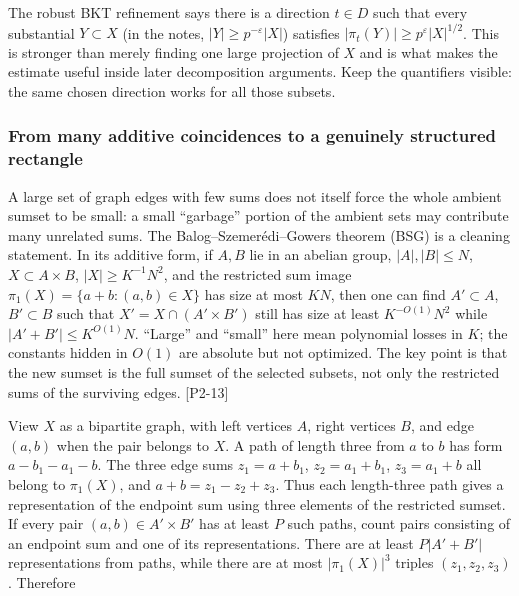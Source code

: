 The robust BKT refinement says there is a direction \(t\in D\) such that every substantial \(Y\subset X\) (in the notes, \(|Y|\ge p^{-\varepsilon}|X|\)) satisfies \(|\pi_t(Y)|\ge p^{\varepsilon}|X|^{1/2}\). This is stronger than merely finding one large projection of \(X\) and is what makes the estimate useful inside later decomposition arguments. Keep the quantifiers visible: the same chosen direction works for all those subsets.

\subsubsection{From many additive coincidences to a genuinely structured rectangle}\label{04-visual-computing-ii-ch033-from-many-additive-coincidences-to-a-genuinely-structured-rectangle}

\hypertarget{04-visual-computing-ii-ch033-from-many-additive-coincidences-to-a-genuinely-structured-rectangle}{}

A large set of graph edges with few sums does not itself force the whole ambient sumset to be small: a small ``garbage'' portion of the ambient sets may contribute many unrelated sums. The Balog--Szemerédi--Gowers theorem (BSG) is a cleaning statement. In its additive form, if \(A,B\) lie in an abelian group, \(|A|,|B|\le N\), \(X\subset A\times B\), \(|X|\ge K^{-1}N^2\), and the restricted sum image \(\pi_1(X)=\{a+b:(a,b)\in X\}\) has size at most \(KN\), then one can find \(A'\subset A\), \(B'\subset B\) such that \(X'=X\cap(A'\times B')\) still has size at least \(K^{-O(1)}N^2\) while \(|A'+B'|\le K^{O(1)}N\). ``Large'' and ``small'' here mean polynomial losses in \(K\); the constants hidden in \(O(1)\) are absolute but not optimized. The key point is that the new sumset is the full sumset of the selected subsets, not only the restricted sums of the surviving edges. {[}P2-13{]}

View \(X\) as a bipartite graph, with left vertices \(A\), right vertices \(B\), and edge \((a,b)\) when the pair belongs to \(X\). A path of length three from \(a\) to \(b\) has form \(a-b_1-a_1-b\). The three edge sums \(z_1=a+b_1\), \(z_2=a_1+b_1\), \(z_3=a_1+b\) all belong to \(\pi_1(X)\), and \(a+b=z_1-z_2+z_3\). Thus each length-three path gives a representation of the endpoint sum using three elements of the restricted sumset. If every pair \((a,b)\in A'\times B'\) has at least \(P\) such paths, count pairs consisting of an endpoint sum and one of its representations. There are at least \(P|A'+B'|\) representations from paths, while there are at most \(|\pi_1(X)|^3\) triples \((z_1,z_2,z_3)\). Therefore

